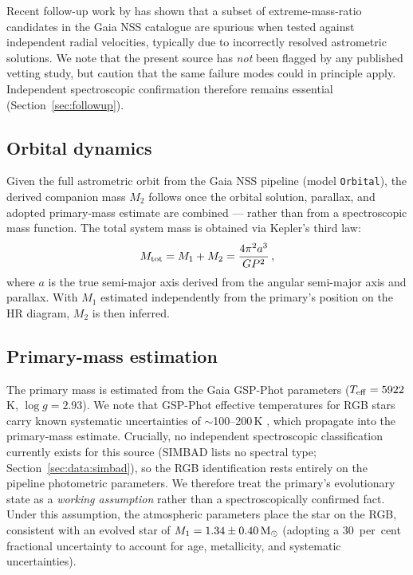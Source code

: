 \documentclass[usenatbib,fleqn]{mnras}
\newcommand{\Msun}{{\rm M}_\odot}
\begin{document}
Recent follow-up work by \citet{ElBadry2024} has shown that a subset
of extreme-mass-ratio candidates in the Gaia NSS catalogue are
spurious when tested against independent radial velocities, typically
due to incorrectly resolved astrometric solutions.  We note that the
present source has {\em not} been flagged by any published
vetting study, but caution that the same failure modes could in
principle apply.  Independent spectroscopic confirmation therefore
remains essential (Section~\ref{sec:followup}).

\subsection{Orbital dynamics}
\label{sec:methods:orbit}

Given the full astrometric orbit from the Gaia NSS pipeline
(model \texttt{Orbital}), the derived companion mass $M_2$
follows once the orbital solution, parallax, and adopted
primary-mass estimate are combined --- rather than from a
spectroscopic mass function.  The total system mass is obtained via
Kepler's third law:
\begin{equation}
M_{\rm tot} = M_1 + M_2 = \frac{4\pi^2 a^3}{G P^2} \,,
\label{eq:kepler}
\end{equation}
where $a$ is the true semi-major axis derived from the angular
semi-major axis and parallax.  With $M_1$ estimated independently
from the primary's position on the HR diagram, $M_2$ is then
inferred.

\subsection{Primary-mass estimation}
\label{sec:methods:m1}

The primary mass is estimated from the Gaia GSP-Phot parameters
($T_{\rm eff} = 5922$\,K, $\log g = 2.93$).  We note that
GSP\nobreakdash-Phot effective temperatures for RGB stars carry known
systematic uncertainties of $\sim$100--200\,K
\citep{Andrae2023}, which propagate into the primary-mass
estimate.  Crucially, no independent spectroscopic
classification currently exists for this source (SIMBAD lists no
spectral type; Section~\ref{sec:data:simbad}), so the RGB
identification rests entirely on the pipeline photometric
parameters.  We therefore treat the primary's evolutionary state
as a \emph{working assumption} rather than a spectroscopically
confirmed fact.  Under this assumption, the atmospheric
parameters place the star on the RGB, consistent
with an evolved star of $M_1 = 1.34 \pm 0.40\,\Msun$ (adopting a
30~per~cent fractional uncertainty to account for age, metallicity,
and systematic uncertainties).
\end{document}
